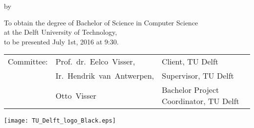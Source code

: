 \makecover

\begin{titlepage}
  \begin{center}
    {\makeatletter
    \largetitlestyle\fontsize{64}{94}\selectfont\@title
    \makeatother}

    {\makeatletter
    \ifx\@subtitle\undefined\else
        \bigskip
       {\tudsffamily\fontsize{22}{32}\selectfont\@subtitle}
    \fi
    \makeatother}

    \bigskip
    \bigskip

    by

    \bigskip
    \bigskip

    {\makeatletter
    \largetitlestyle\fontsize{26}{26}\selectfont\@author
    \makeatother}

    \bigskip
    \bigskip
    \vfill

    {\large
      To obtain the degree of Bachelor of Science in Computer
      Science\\
      at the Delft University of Technology,\\
      to be presented July 1st, 2016 at 9:30.
    }

    \bigskip
    \bigskip
    \vfill

    \begin{tabular}{lll}
      Committee: & Prof.~dr.~Eelco~Visser,    & Client, TU Delft \\
                 & Ir.~Hendrik~van~Antwerpen, & Supervisor, TU Delft \\
                 & Otto~Visser                & Bachelor Project
                                                Coordinator, TU Delft
    \end{tabular}

    \vfill
    \texttt{[image: TU\_Delft\_logo\_Black.eps]}
  \end{center}
\end{titlepage}
